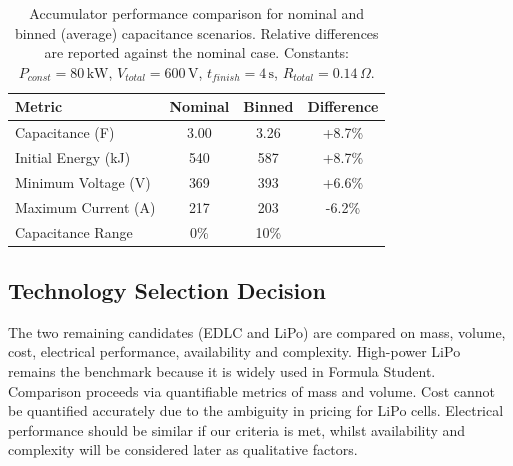 \documentclass[11pt, a4paper]{report}
\numberwithin{equation}{section}
\begin{document}
\begin{table}[htbp]
    \centering
    \caption{Accumulator performance comparison for nominal and binned (average) capacitance scenarios. Relative differences are reported against the nominal case. Constants: $P_{const}=80\,\mathrm{kW}$, $V_{total}=600\,\mathrm{V}$, $t_{finish}=4\,\mathrm{s}$, $R_{total}=0.14\,\Omega$.}
    \label{tab:capacitance_binning_results}
    \footnotesize
    \begin{tabular}{|l|c|c|c|}
        \hline
        \textbf{Metric} & \textbf{Nominal} & \textbf{Binned} & \textbf{Difference} \\
        \hline
        Capacitance (F) & 3.00 & 3.26 & +8.7\% \\
        Initial Energy (kJ) & 540 & 587 & +8.7\% \\
        Minimum Voltage (V) & 369 & 393 & +6.6\% \\
        Maximum Current (A) & 217 & 203 & -6.2\% \\
        Capacitance Range & 0\% & 10\% & \\
        \hline
    \end{tabular}
\end{table}

\subsection{Technology Selection Decision}

The two remaining candidates (EDLC and LiPo) are compared on mass, volume, cost, electrical performance, availability and complexity. High-power LiPo remains the benchmark because it is widely used in Formula Student. Comparison proceeds via quantifiable metrics of mass and volume. Cost cannot be quantified accurately due to the ambiguity in pricing for LiPo cells. Electrical performance should be similar if our criteria is met, whilst availability and complexity will be considered later as qualitative factors.
\end{document}
